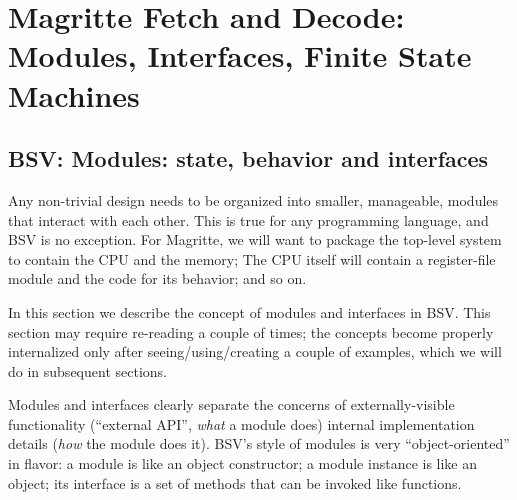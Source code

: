 

\chapter{Magritte Fetch and Decode: Modules, Interfaces, Finite State Machines}


\setcounter{page}{1}
\renewcommand{\thepage}{\arabic{chapter}-\arabic{page}}

\label{ch_Magritte_Fetch_Decode}


\section{BSV: Modules: state, behavior and interfaces}

\label{Sec_Magritte_Fetch_Decode_Modules}


Any non-trivial design needs to be organized into smaller, manageable,
modules that interact with each other. This is true for any
programming language, and BSV is no exception.  For Magritte, we will
want to package the top-level system to contain the CPU and the
memory; The CPU itself will contain a register-file module and the
code for its behavior; and so on.

In this section we describe the concept of modules and interfaces in
BSV.  This section may require re-reading a couple of times; the
concepts become properly internalized only after seeing/using/creating
a couple of examples, which we will do in subsequent sections.

Modules and interfaces clearly separate the concerns of
externally-visible functionality (``external API'', \emph{what} a
module does) {\vs} internal implementation details (\emph{how} the
module does it).  BSV's style of modules is very ``object-oriented''
in flavor: a module is like an object constructor; a module instance
is like an object; its interface is a set of methods that can be
invoked like functions.


